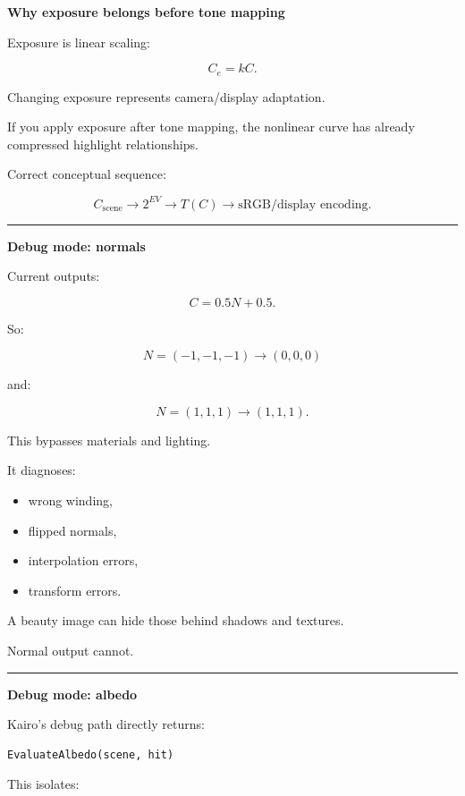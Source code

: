 \textbf{Why exposure belongs before tone mapping}

Exposure is linear scaling:

\[
C_e=kC.
\]

Changing exposure represents camera/display adaptation.

If you apply exposure after tone mapping, the nonlinear curve has already compressed highlight relationships.

Correct conceptual sequence:

\[
\boxed{
C_{\text{scene}}
\rightarrow
2^{EV}
\rightarrow
T(C)
\rightarrow
\text{sRGB/display encoding}.
}
\]

\begin{center}\rule{0.5\linewidth}{0.5pt}\end{center}

\textbf{Debug mode: normals}

Current  outputs:

\[
\boxed{
C=
0.5N+0.5.
}
\]

So:

\[
N=(-1,-1,-1)
\rightarrow
(0,0,0)
\]

and:

\[
N=(1,1,1)
\rightarrow
(1,1,1).
\]

This bypasses materials and lighting.

It diagnoses:

\begin{itemize}
\tightlist
\item
  wrong winding,
\item
  flipped normals,
\item
  interpolation errors,
\item
  transform errors.
\end{itemize}

A beauty image can hide those behind shadows and textures.

Normal output cannot.

\begin{center}\rule{0.5\linewidth}{0.5pt}\end{center}

\textbf{Debug mode: albedo}

Kairo's debug path directly returns:

\begin{verbatim}
EvaluateAlbedo(scene, hit)
\end{verbatim}

This isolates:


